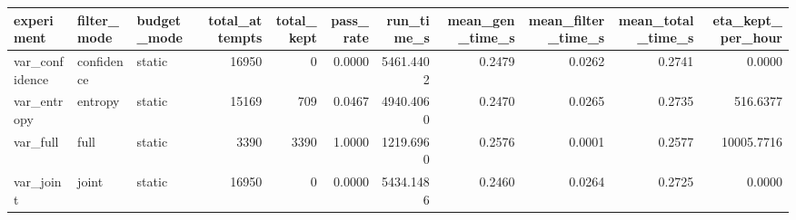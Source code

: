 \begin{tabular}{lllrrrrrrrr}
\toprule
experiment & filter_mode & budget_mode & total_attempts & total_kept & pass_rate & run_time_s & mean_gen_time_s & mean_filter_time_s & mean_total_time_s & eta_kept_per_hour \\
\midrule
var_confidence & confidence & static & 16950 & 0 & 0.0000 & 5461.4402 & 0.2479 & 0.0262 & 0.2741 & 0.0000 \\
var_entropy & entropy & static & 15169 & 709 & 0.0467 & 4940.4060 & 0.2470 & 0.0265 & 0.2735 & 516.6377 \\
var_full & full & static & 3390 & 3390 & 1.0000 & 1219.6960 & 0.2576 & 0.0001 & 0.2577 & 10005.7716 \\
var_joint & joint & static & 16950 & 0 & 0.0000 & 5434.1486 & 0.2460 & 0.0264 & 0.2725 & 0.0000 \\
\bottomrule
\end{tabular}
